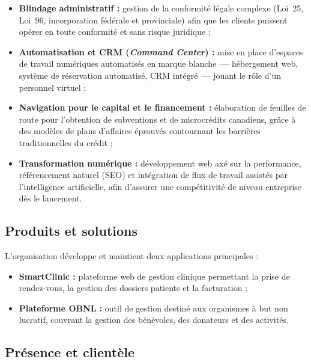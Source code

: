 \begin{itemize}
  \item \textbf{Blindage administratif :} gestion de la conformité légale complexe
        (Loi~25, Loi~96, incorporation fédérale et provinciale) afin que les clients
        puissent opérer en toute conformité et sans risque juridique ;

  \item \textbf{Automatisation et CRM (\textit{Command Center}) :} mise en place
        d'espaces de travail numériques automatisés en marque blanche~— hébergement web,
        système de réservation automatisé, CRM intégré~— jouant le rôle d'un personnel
        virtuel ;

  \item \textbf{Navigation pour le capital et le financement :} élaboration de feuilles
        de route pour l'obtention de subventions et de microcrédits canadiens, grâce à
        des modèles de plans d'affaires éprouvés contournant les barrières traditionnelles
        du crédit ;

  \item \textbf{Transformation numérique :} développement web axé sur la performance,
        référencement naturel (SEO) et intégration de flux de travail assistés par
        l'intelligence artificielle, afin d'assurer une compétitivité de niveau entreprise
        dès le lancement.
\end{itemize}

\subsection{Produits et solutions}

L'organisation développe et maintient deux applications principales :

\begin{itemize}
  \item \textbf{SmartClinic :} plateforme web de gestion clinique permettant la prise
        de rendez-vous, la gestion des dossiers patients et la facturation ;
  \item \textbf{Plateforme OBNL :} outil de gestion destiné aux organismes à but non
        lucratif, couvrant la gestion des bénévoles, des donateurs et des activités.
\end{itemize}

\subsection{Présence et clientèle}

